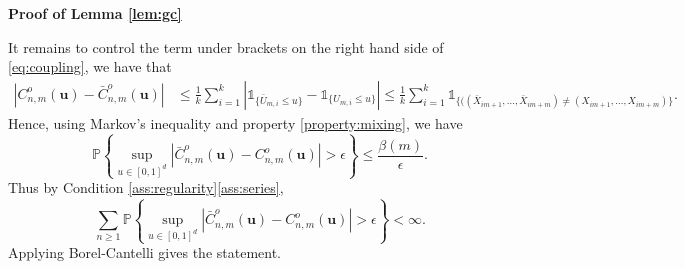 \documentclass[11pt]{article}
\makeatletter
\theoremstyle{definition}
\renewenvironment{proof}[1][\proofname]{\par
\pushQED{\qed}%
\normalfont \topsep6\p@\@plus6\p@\relax
\trivlist
\item\relax
{\textbf{
#1\@addpunct{ }}}\hspace\labelsep\ignorespaces
}{%
\popQED\endtrivlist\@endpefalse
}
\makeatother
\begin{document}
\begin{proof}[Proof of Lemma \ref{lem:gc}]
		It remains to control the term under brackets on the right hand side of \eqref{eq:coupling}, we have that
		\begin{align*}
			\left| C_{n,m}^o(\textbf{u}) - \bar{C}_{n,m}^o(\textbf{u}) \right| &\leq \frac{1}{k} \sum_{i=1}^k \left| \mathds{1}_{ \{\bar{U}_{m,i} \leq u \}} - \mathds{1}_{\{ U_{m,i} \leq u \}} \right| \leq \frac{1}{k} \sum_{i=1}^k \mathds{1}_{\{ ((\bar{X}_{im+1},\dots, \bar{X}_{im+m}) \neq (X_{im+1}, \dots, X_{im+m}) \}}.
		\end{align*}
		Hence, using Markov's inequality and property \ref{property:mixing}, we have
		\begin{equation*}
			\mathbb{P}\left\{ \underset{u \in [0,1]^d}{\sup} \left| \bar{C}_{n,m}^o(\textbf{u}) - C_{n,m}^o(\textbf{u}) \right| > \epsilon \right\} \leq \frac{\beta(m)}{\epsilon}.
		\end{equation*}
		Thus by Condition \ref{ass:regularity}\ref{ass:series},
		\begin{equation*}
		\sum_{n \geq 1 }\mathbb{P}\left\{ \underset{u \in [0,1]^d}{\sup} \left| \bar{C}_{n,m}^o(\textbf{u}) - C_{n,m}^o(\textbf{u}) \right| > \epsilon \right\} < \infty.
		\end{equation*}
		Applying Borel-Cantelli gives the statement.
	\end{proof}
	
\end{document}
